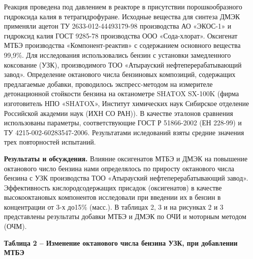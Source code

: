 Реакция проведена под давлением в реакторе в присутствии
порошкообразного гидроксида калия в тетрагидрофуране. Исходные вещества
для синтеза ДМЭК применяли ацетон ТУ 2633-012-44493179-98 производства
АО «ЭКОС-1» и гидроксид калия ГОСТ 9285-78 производства ООО
«Сода-хлорат». Оксигенат МТБЭ производства «Компонент-реактив» с
содержанием основного вещества 99,9\%. Для исследования использовались
бензин с установки замедленного коксование (УЗК), производимого ТОО
«Атырауский нефтеперерабатывающий завод». Определение октанового числа
бензиновых композиций, содержащих предлагаемые добавки, проводилось
экспресс-методом на измерителе детонационной стойкости бензина на
октанометре SHATOX SX-100K (фирма изготовитель НПО «SHATOX», Институт
химических наук Сибирское отделение Российской академии наук (ИХН СО
РАН)). В качестве эталонов сравнения использованы параметры,
соответствующие ГОСТ Р 51866-2002 (ЕН 228-99) и ТУ
4215-002-60283547-2006. Результатами иследований взяты средние значения
трех повторностей испытаний.

{\bfseries Результаты и обсуждения.} Влияние оксигенатов МТБЭ и ДМЭК на
повышение октанового число бензина нами определялось по приросту
октанового числа бензина с УЗК производства ТОО «Атырауский
нефтеперерабатывающий завод». Эффективность кислородсодержащих присадок
(оксигенатов) в качестве высокооктановых компонентов исследовали при
введении их в бензин в концентрации от 3-х до15\% (масс.). В таблицах 2,
3 и на рисунках 2 и 3 представлены результаты добавки МТБЭ и ДМЭК по ОЧИ
и моторным методом (ОЧМ).

{\bfseries Таблица 2 -- Изменение октанового числа бензина УЗК, при
добавлении МТБЭ}

